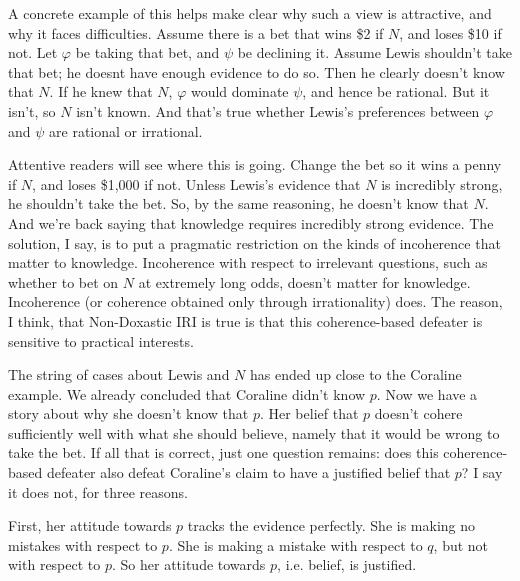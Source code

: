 A concrete example of this helps make clear why such a view is attractive, and why it faces difficulties. Assume there is a bet that wins \$2 if $N$, and loses \$10 if not. Let $\varphi$ be taking that bet, and $\psi$ be declining it. Assume Lewis shouldn't take that bet; he doesnt have enough evidence to do so. Then he clearly doesn't know that $N$. If he knew that $N$, $\varphi$ would dominate $\psi$, and hence be rational. But it isn't, so $N$ isn't known. And that's true whether Lewis's preferences between $\varphi$ and $\psi$ are rational or irrational.

Attentive readers will see where this is going. Change the bet so it wins a penny if $N$, and loses \$1,000 if not. Unless Lewis's evidence that $N$ is incredibly strong, he shouldn't take the bet. So, by the same reasoning, he doesn't know that $N$. And we're back saying that knowledge requires incredibly strong evidence. The solution, I say, is to put a pragmatic restriction on the kinds of incoherence that matter to knowledge. Incoherence with respect to irrelevant questions, such as whether to bet on $N$ at extremely long odds, doesn't matter for knowledge. Incoherence (or coherence obtained only through irrationality) does. The reason, I think, that Non-Doxastic IRI is true is that this coherence-based defeater is sensitive to practical interests.

The string of cases about Lewis and $N$ has ended up close to the Coraline example. We already concluded that Coraline didn't know $p$. Now we have a story about why she doesn't know that $p$. Her belief that $p$ doesn't cohere sufficiently well with what she should believe, namely that it would be wrong to take the bet. If all that is correct, just one question remains: does this coherence-based defeater also defeat Coraline's claim to have a justified belief that $p$? I say it does not, for three reasons.

First, her attitude towards $p$ tracks the evidence perfectly. She is making no mistakes with respect to $p$. She is making a mistake with respect to $q$, but not with respect to $p$. So her attitude towards $p$, i.e. belief, is justified.

